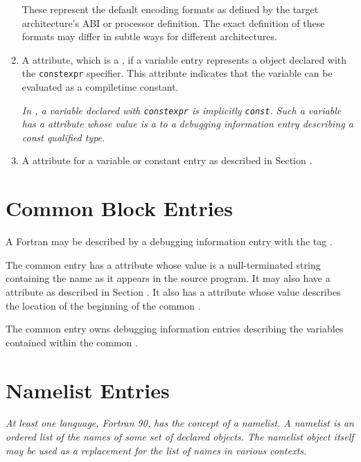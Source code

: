 \begin{enumerate}[1. ]
These represent the default encoding formats as defined by
the target architecture's ABI or processor definition. The
exact definition of these formats may differ in subtle ways
for different architectures.


\item A \DWATconstexpr{} attribute, 
which 
\hypertarget{chap:DWATconstexprcompiletimeconstantobject}{}
is a , if a
variable entry represents a  object declared with the
\texttt{constexpr} specifier. This attribute indicates that the
variable can be evaluated as a compile\dash time constant.  

\textit{In ,
a variable declared with \texttt{constexpr} is implicitly \texttt{const}. Such a
variable has a \DWATtype{} attribute whose value is a 
to a debugging information entry describing a const qualified type.}

\item A \DWATlinkagename{} attribute for a 
variable or constant entry as described in 
Section .

\end{enumerate}

\section{Common Block Entries}
\label{chap:commonblockentries}
A Fortran   
may 
be described by a debugging
information entry with the 
tag \DWTAGcommonblockTARG. 

The common  
entry has a \DWATname{} attribute 
whose value
is a null-terminated string containing the 
 
name as it appears in the source program. It may also have a
\DWATlinkagename{} attribute as described in 
Section . 
It
also has a \DWATlocation{} attribute
whose value describes the
location of the beginning of the common . 

The common
 entry owns debugging information entries describing
the variables contained within the common .

\section{Namelist Entries}
\label{chap:namelistentries}
\textit{At least one language, Fortran 90, has the concept of a
namelist. A namelist is an ordered list of the names of some
set of declared objects. The namelist object itself may be used
as a replacement for the list of names in various contexts.}

